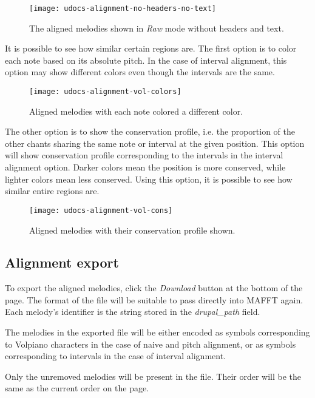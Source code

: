 \begin{figure}[!h]
\centering
\texttt{[image: udocs-alignment-no-headers-no-text]}
\caption{The aligned melodies shown in \emph{Raw} mode without headers and text.}
\label{fig:align-no-text}
\end{figure}

It is possible to see how similar certain regions are. The first option is to color each note based on its absolute pitch. In the case of interval alignment,
this option may show different colors even though the intervals are the same.

\begin{figure}[!h]
\centering
\texttt{[image: udocs-alignment-vol-colors]}
\caption{Aligned melodies with each note colored a different color.}
\label{fig:align-colors}
\end{figure}

The other option is to show the conservation profile, i.e. the proportion of the other chants sharing the same note or interval at the given position. This option will show
conservation profile corresponding to the intervals in the interval alignment option. Darker colors mean the position is more conserved, while lighter colors mean less conserved.
Using this option, it is possible to see how similar entire regions are.

\begin{figure}[!h]
\centering
\texttt{[image: udocs-alignment-vol-cons]}
\caption{Aligned melodies with their conservation profile shown.}
\label{fig:align-cons}
\end{figure}

\subsection{Alignment export}

To export the aligned melodies, click the \emph{Download} button at the bottom of the page. The format of the file will be suitable to pass directly into MAFFT again. Each melody's
identifier is the string stored in the \emph{drupal\_path} field.

The melodies in the exported file will be either encoded as symbols corresponding to Volpiano characters in the case of naive and pitch alignment, or as symbols corresponding to intervals
in the case of interval alignment.

Only the unremoved melodies will be present in the file. Their order will be the same as the current order on the page.

